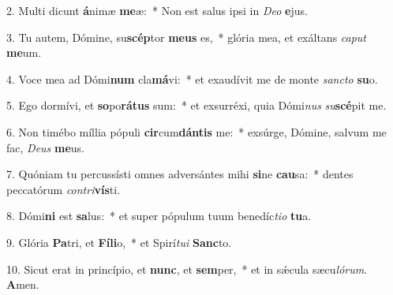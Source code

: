 2. Multi dicunt \textbf{á}nimæ \textbf{me}æ:~*  Non est salus ipsi in \textit{De}\textit{o} \textbf{e}jus.\

3. Tu autem, Dómine, su\textbf{scép}tor \textbf{me}\textbf{us} es,~*  glória mea, et exáltans \textit{ca}\textit{put} \textbf{me}um.\

4. Voce mea ad Dómi\textbf{num} cla\textbf{má}vi:~*  et exaudívit me de monte \textit{sanc}\textit{to} \textbf{su}o.\

5. Ego dormívi, et \textbf{so}po\textbf{rá}\textbf{tus} sum:~*  et exsurréxi, quia Dómi\textit{nus} \textit{su}\textbf{scé}pit me.\

6. Non timébo míllia pópuli \textbf{cir}cum\textbf{dán}\textbf{tis} me:~*  exsúrge, Dómine, salvum me fac, \textit{De}\textit{us} \textbf{me}us.\

7. Quóniam tu percussísti omnes adversántes mihi \textbf{si}ne \textbf{cau}sa:~*  dentes peccatórum \textit{con}\textit{tri}\textbf{vís}ti.\

8. Dómi\textbf{ni} est \textbf{sa}lus:~*  et super pópulum tuum benedíc\textit{ti}\textit{o} \textbf{tu}a.\

9. Glória \textbf{Pa}tri, et \textbf{Fí}\textbf{li}o,~*  et Spirí\textit{tu}\textit{i} \textbf{Sanc}to.\

10. Sicut erat in princípio, et \textbf{nunc}, et \textbf{sem}per,~*  et in sǽcula sæcu\textit{ló}\textit{rum}. \textbf{A}men.\

